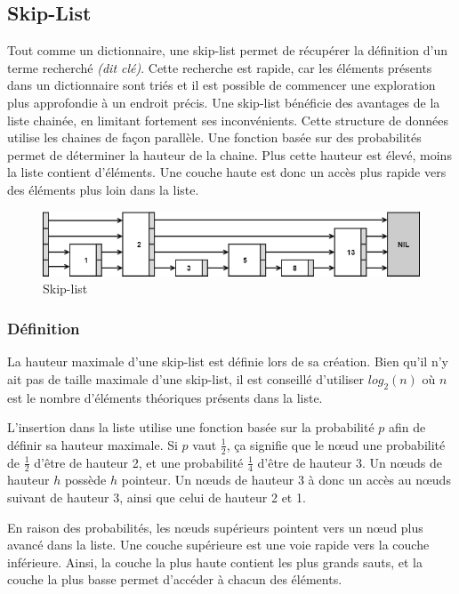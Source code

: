 \documentclass[hidelinks,a4paper, 12pt]{article}
\begin{document}
	\newpage
	\subsection{Skip-List}
	Tout comme un dictionnaire, une skip-list permet de récupérer la définition d'un terme recherché \textit{(dit clé)}. Cette recherche est rapide, car les éléments présents dans un dictionnaire sont triés et il est possible de commencer une exploration plus approfondie à un endroit précis.
	 Une skip-list bénéficie des avantages de la liste chainée, en limitant fortement ses inconvénients. Cette structure de données utilise les chaines de façon parallèle. Une fonction basée sur des probabilités permet de déterminer la hauteur de la chaine. Plus cette hauteur est élevé, moins la liste contient d'éléments. Une couche haute est donc un accès plus rapide vers des éléments plus loin dans la liste.
	 
	 \begin{figure}[h]
	 	\label{skip}
	 	\includegraphics[width=\textwidth]{img/skip}
	 	\caption{Skip-list}
	 \end{figure}
	 
	\subsubsection*{Définition}
	La hauteur maximale d'une skip-list est définie lors de sa création. Bien qu'il n'y ait pas de taille maximale d'une skip-list, il est conseillé d'utiliser $log_2(n)$ où $n$ est le nombre d'éléments théoriques présents dans la liste. 
	
	L'insertion dans la liste utilise une fonction basée sur la probabilité $p$ afin de définir sa hauteur maximale. Si $p$ vaut $\frac{1}{2}$, ça signifie que le nœud une probabilité de $\frac{1}{2}$ d'être de hauteur 2, et une probabilité $\frac{1}{4}$ d'être de hauteur 3. Un nœuds de hauteur $h$ possède $h$ pointeur. Un nœuds de hauteur 3 à donc un accès au nœuds suivant de hauteur 3, ainsi que celui de hauteur 2 et 1.
	
	En raison des probabilités, les nœuds supérieurs pointent vers un nœud plus avancé dans la liste. Une couche supérieure est une voie rapide vers la couche inférieure. Ainsi, la couche la plus haute contient les plus grands sauts, et la couche la plus basse permet d'accéder à chacun des éléments.
		
\end{document}
